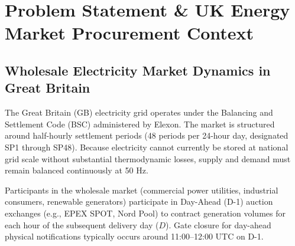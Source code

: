 \documentclass[11pt,a4paper]{article}
\begin{document}
\newpage
\tableofcontents
\newpage

\section{Problem Statement \& UK Energy Market Procurement Context}

\subsection{Wholesale Electricity Market Dynamics in Great Britain}
The Great Britain (GB) electricity grid operates under the Balancing and Settlement Code (BSC) administered by Elexon. The market is structured around half-hourly settlement periods (48 periods per 24-hour day, designated SP1 through SP48). Because electricity cannot currently be stored at national grid scale without substantial thermodynamic losses, supply and demand must remain balanced continuously at 50 Hz.

Participants in the wholesale market (commercial power utilities, industrial consumers, renewable generators) participate in Day-Ahead (D-1) auction exchanges (e.g., EPEX SPOT, Nord Pool) to contract generation volumes for each hour of the subsequent delivery day ($D$). Gate closure for day-ahead physical notifications typically occurs around 11:00--12:00 UTC on D-1.
\end{document}
